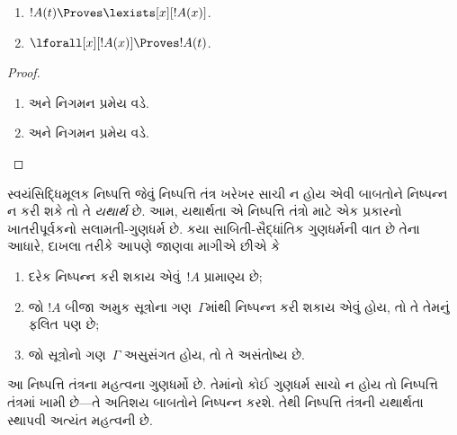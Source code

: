 

\begin{prop}
\begin{enumerate}
\item $!A(t) \Proves \lexists[x][!A(x)]$.

\item $\lforall[x][!A(x)] \Proves !A(t)$.
\end{enumerate}
\end{prop}

\begin{proof}
\begin{enumerate}
\item {} અને નિગમન પ્રમેય વડે.
\item {} અને નિગમન પ્રમેય વડે.
\end{enumerate}
\end{proof}
\endgroup


\begingroup
\makeatletter{}\makeatother


\label{guunit:OLP-0124}


\begin{explain}
સ્વયંસિદ્ધિમૂલક નિષ્પત્તિ જેવું નિષ્પત્તિ તંત્ર ખરેખર સાચી ન
હોય એવી બાબતોને નિષ્પન્ન ન કરી શકે તો તે \emph{યથાર્થ} છે. આમ,
યથાર્થતા એ નિષ્પત્તિ તંત્રો માટે એક પ્રકારનો ખાતરીપૂર્વકનો
સલામતી-ગુણધર્મ છે. કયા સાબિતી-સૈદ્ધાંતિક ગુણધર્મની વાત છે તેના આધારે,
દાખલા તરીકે આપણે જાણવા માગીએ છીએ કે
\begin{enumerate}
\item દરેક નિષ્પન્ન કરી શકાય એવું~$!A$ પ્રામાણ્ય છે;
\item જો $!A$ બીજા અમુક સૂત્રોના ગણ~$\Gamma$માંથી નિષ્પન્ન કરી શકાય એવું હોય,
  તો તે તેમનું ફલિત પણ છે;
\item જો સૂત્રોનો ગણ~$\Gamma$ અસુસંગત હોય, તો તે અસંતોષ્ય છે.
\end{enumerate}
આ નિષ્પત્તિ તંત્રના મહત્વના ગુણધર્મો છે. તેમાંનો કોઈ ગુણધર્મ
સાચો ન હોય તો નિષ્પત્તિ તંત્રમાં ખામી છે---તે અતિશય બાબતોને
નિષ્પન્ન કરશે. તેથી નિષ્પત્તિ તંત્રની યથાર્થતા સ્થાપવી અત્યંત
મહત્વની છે.
\end{explain}

